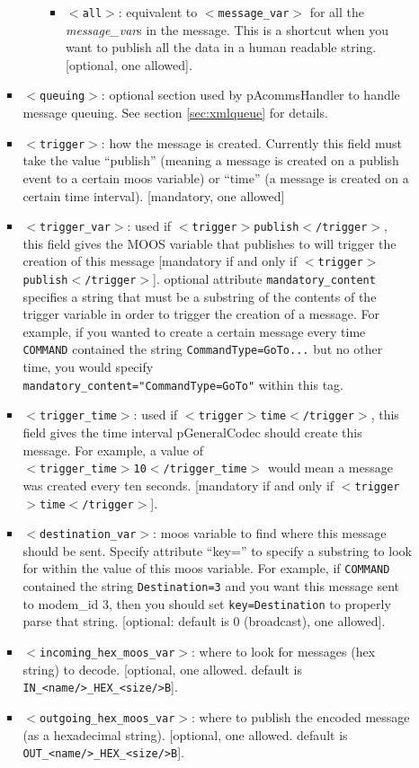\documentclass[11pt, letterpaper, oneside]{memoir}
\newcommand{\xmltag}[1]{\texttt{$<$#1$>$}}
\begin{document}
\begin{itemize}
\begin{itemize}
\begin{itemize}
\begin{itemize}
\begin{itemize}
\item \xmltag{all}: equivalent to \xmltag{message\_var} for all the \textit{message\_var}s in the message. This is a shortcut when you want to publish all the data in a human readable string. [optional, one allowed].
\end{itemize}
\end{itemize}
\item \xmltag{queuing}: optional section used by pAcommsHandler to handle message queuing. See section \ref{sec:xmlqueue} for details.
\item \xmltag{trigger}: how the message is created. Currently this field must take the value ``publish'' (meaning a message is created on a publish event to a certain moos variable) or ``time'' (a message is created on a certain time interval). [mandatory, one allowed]
\item \xmltag{trigger\_var}: used if \xmltag{trigger$>$publish$<$/trigger}, this field gives the MOOS variable that publishes to will trigger the creation of this message [mandatory if and only if \xmltag{trigger$>$publish$<$/trigger}]. optional attribute \verb|mandatory_content| specifies a string that must be a substring of the contents of the trigger variable in order to trigger the creation of a message. For example, if you wanted to create a certain message every time \verb|COMMAND| contained the string \verb|CommandType=GoTo...| but no other time, you would specify \\ \verb|mandatory_content="CommandType=GoTo"| within this tag.
\item \xmltag{trigger\_time}: used if \xmltag{trigger$>$time$<$/trigger}, this field gives the time interval pGeneralCodec should create this message. For example, a value of \\ \xmltag{trigger\_time$>$10$<$/trigger\_time} would mean a message was created every ten seconds. [mandatory if and only if \xmltag{trigger$>$time$<$/trigger}].
\item \xmltag{destination\_var}: moos variable to find where this message should be sent. Specify attribute ``key='' to specify a substring to look for within the value of this moos variable. For example, if \verb|COMMAND| contained the string \verb|Destination=3| and you want this message sent to modem\_id 3, then you should set \verb|key=Destination| to properly parse that string. [optional: default is 0 (broadcast), one allowed].
\item \xmltag{incoming\_hex\_moos\_var}: where to look for messages (hex string) to decode. [optional, one allowed. default is \verb|IN_<name/>_HEX_<size/>B|].
\item \xmltag{outgoing\_hex\_moos\_var}: where to publish the encoded message (as a hexadecimal string). [optional, one allowed. default is \verb|OUT_<name/>_HEX_<size/>B|].
\end{itemize}
\end{itemize}


\end{itemize}
\end{document}
